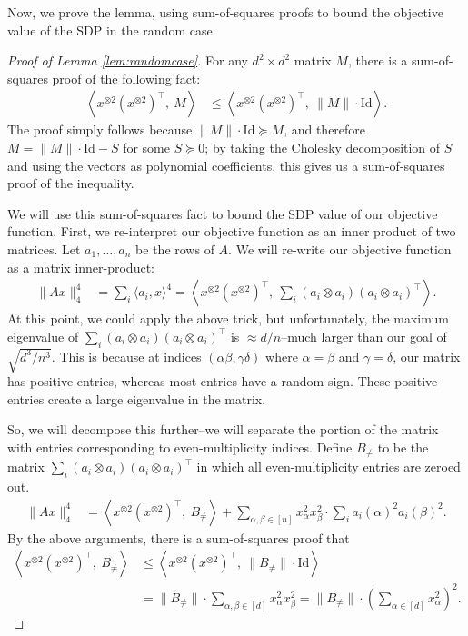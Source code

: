 \documentclass[a4paper,11pt]{article}
\newcommand{\Id}{\mathrm{Id}}
\theoremstyle{definition}
\begin{document}
Now, we prove the lemma, using sum-of-squares proofs to bound the objective value of the SDP in the random case.
\begin{proof}[Proof of Lemma \ref{lem:randomcase}]
For any $d^2 \times d^2$ matrix $M$,  there is a sum-of-squares proof of the following fact:
\begin{align*}
\left\langle x^{\otimes 2}(x^{\otimes 2})^{\top}, \ M\right\rangle
&\le
\left\langle x^{\otimes 2}(x^{\otimes 2})^{\top}, \ \|M\|\cdot \Id \right\rangle.
\end{align*}
The proof simply follows because $\|M\|\cdot \Id \succeq M$, and therefore $M = \|M\|\cdot \Id - S$ for some $S \succeq 0$; by taking the Cholesky decomposition of $S$ and using the vectors as polynomial coefficients, this gives us a sum-of-squares proof of the inequality.

We will use this sum-of-squares fact to bound the SDP value of our objective function.
First, we re-interpret our objective function as an inner product of two matrices.
Let $a_1,\ldots,a_n$ be the rows of $A$.
We will re-write our objective function as a matrix inner-product:
\begin{align*}
\|Ax\|^4_4
&= \sum_{i}\langle a_i, x \rangle^4
= \left\langle x^{\otimes 2}(x^{\otimes 2})^{\top}, \ \sum_i (a_i \otimes a_i)(a_i \otimes a_i)^{\top}\right\rangle.
\end{align*}
At this point, we could apply the above trick, but unfortunately, the maximum eigenvalue of $\sum_i (a_i\otimes a_i)(a_i \otimes a_i)^{\top}$ is $\approx d/n$--much larger than our goal of $\sqrt{d^3/n^3}$.
This is because at indices $(\alpha\beta,\gamma\delta)$ where $\alpha = \beta$ and $\gamma = \delta$, our matrix has positive entries, whereas most entries have a random sign.
These positive entries create a large eigenvalue in the matrix.


So, we will decompose this further--we will separate the portion of the matrix with entries corresponding to even-multiplicity indices.
Define $B_{\neq}$ to be the matrix $\sum_{i} (a_i \otimes a_i)(a_i \otimes a_i)^{\top}$ in which all even-multiplicity entries are zeroed out.
\begin{align*}
\|Ax\|^4_4
&= \left\langle x^{\otimes 2}(x^{\otimes 2})^{\top}, \ B_{\neq} \right\rangle + \sum_{\alpha,\beta \in [n]} x_{\alpha}^2x_{\beta}^2\cdot \sum_{i} a_{i}(\alpha)^2 a_{i}(\beta)^2.
\end{align*}
By the above arguments, there is a sum-of-squares proof that
\begin{align*}
\left\langle x^{\otimes 2}(x^{\otimes 2})^{\top}, \ B_{\neq}\right\rangle
&\le
\left\langle x^{\otimes 2}(x^{\otimes 2})^{\top}, \ \|B_{\neq}\|\cdot \Id \right\rangle\\
&=  \|B_{\neq}\|\cdot \sum_{\alpha,\beta\in[d]} x_\alpha^2 x_{\beta}^2
= \|B_{\neq}\|\cdot \left(\sum_{\alpha\in[d]} x_{\alpha}^2 \right)^2.
\end{align*}


\end{proof}
\end{document}
